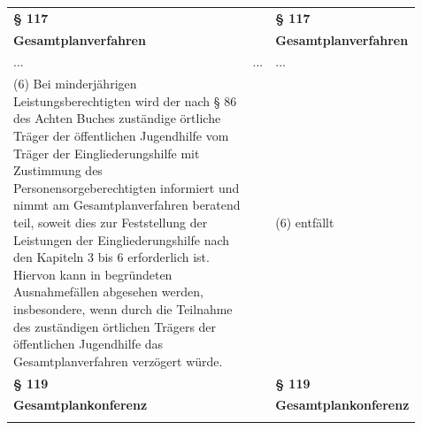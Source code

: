 \documentclass[10pt,a4paper,landscape]{article}
\begin{document}
\begin{longtable}{|L{8.2cm}|L{8.2cm}|L{8.2cm}|}
\textbf{\S{} 117} &  & \textbf{\S{} 117} \\
\hhline{|---|}
\textbf{Gesamtplanverfahren} &  & \textbf{Gesamtplanverfahren} \\
\hhline{|---|}
... & ... & ... \\
\hhline{|---|}
(6) \textcolor{diffred}{Bei minderjährigen  \newline Leistungsberechtigten wird der nach \S{} 86  \newline des Achten Buches zuständige örtliche  \newline Träger der öffentlichen Jugendhilfe vom  \newline Träger der Eingliederungshilfe mit  \newline Zustimmung des  \newline Personensorgeberechtigten informiert und  \newline nimmt am Gesamtplanverfahren beratend  \newline teil, soweit dies zur Feststellung der  \newline Leistungen der Eingliederungshilfe nach  \newline den Kapiteln 3 bis 6 erforderlich ist.  \newline Hiervon kann in begründeten  \newline Ausnahmefällen abgesehen werden,  \newline insbesondere, wenn durch die Teilnahme  \newline des zuständigen örtlichen Trägers der  \newline öffentlichen Jugendhilfe das  \newline Gesamtplanverfahren verzögert würde.} &  & (6) \textcolor{diffgreen}{entfällt} \\
\hhline{|---|}
\textbf{\S{} 119} &  & \textbf{\S{} 119} \\
\hhline{|---|}
\textbf{Gesamtplankonferenz} &  & \textbf{Gesamtplankonferenz} \\
\hhline{|---|}

\end{longtable}
\end{document}

